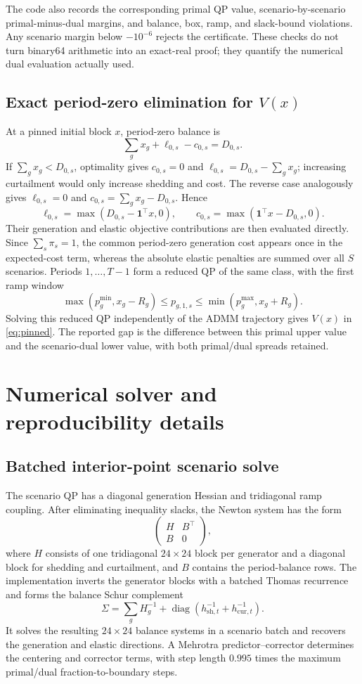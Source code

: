 \documentclass[preprint,12pt,3p]{elsarticle}
\theoremstyle{definition}
\begin{document}
The code also records the corresponding primal QP value, scenario-by-scenario primal-minus-dual margins, and balance, box, ramp, and slack-bound violations. Any scenario margin below $-10^{-6}$ rejects the certificate. These checks do not turn binary64 arithmetic into an exact-real proof; they quantify the numerical dual evaluation actually used.

\subsection{Exact period-zero elimination for $V(x)$}\label{app:pinned}
At a pinned initial block $x$, period-zero balance is
\[
\sum_gx_g+\ell_{0,s}-c_{0,s}=D_{0,s}.
\]
If $\sum_gx_g<D_{0,s}$, optimality gives $c_{0,s}=0$ and $\ell_{0,s}=D_{0,s}-\sum_gx_g$; increasing curtailment would only increase shedding and cost. The reverse case analogously gives $\ell_{0,s}=0$ and $c_{0,s}=\sum_gx_g-D_{0,s}$. Hence
\[
\ell_{0,s}=\max(D_{0,s}-\mathbf1^\top x,0),\qquad
c_{0,s}=\max(\mathbf1^\top x-D_{0,s},0).
\]
Their generation and elastic objective contributions are then evaluated directly. Since $\sum_s\pi_s=1$, the common period-zero generation cost appears once in the expected-cost term, whereas the absolute elastic penalties are summed over all $S$ scenarios. Periods $1,\ldots,T-1$ form a reduced QP of the same class, with the first ramp window
\[
\max(p_g^{\min},x_g-R_g)\leq p_{g,1,s}\leq\min(p_g^{\max},x_g+R_g).
\]
Solving this reduced QP independently of the ADMM trajectory gives $V(x)$ in \eqref{eq:pinned}. The reported gap is the difference between this primal upper value and the scenario-dual lower value, with both primal/dual spreads retained.

\section{Numerical solver and reproducibility details}
\subsection{Batched interior-point scenario solve}
The scenario QP has a diagonal generation Hessian and tridiagonal ramp coupling. After eliminating inequality slacks, the Newton system has the form
\[
\begin{pmatrix}H&B^\top\\B&0\end{pmatrix},
\]
where $H$ consists of one tridiagonal $24\times24$ block per generator and a diagonal block for shedding and curtailment, and $B$ contains the period-balance rows. The implementation inverts the generator blocks with a batched Thomas recurrence and forms the balance Schur complement
\[
\Sigma=\sum_gH_g^{-1}+\operatorname{diag}(h_{\mathrm{sh},t}^{-1}+h_{\mathrm{cur},t}^{-1}).
\]
It solves the resulting $24\times24$ balance systems in a scenario batch and recovers the generation and elastic directions. A Mehrotra predictor--corrector determines the centering and corrector terms, with step length $0.995$ times the maximum primal/dual fraction-to-boundary steps.
\end{document}
